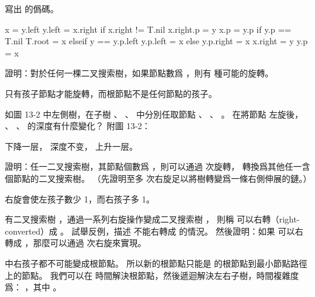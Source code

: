 \startsection[
  title={Rotations},
]

\startEXERCISE
寫出  的僞碼。
\stopEXERCISE

\startANSWER
{}
\startCLRS
x = y.left
y.left = x.right
if x.right != T.nil
	x.right.p = y
x.p = y.p
if y.p == T.nil
	T.root = x
elseif y == y.p.left
	y.p.left = x
else y.p.right = x
x.right = y
y.p = x
\stopCLRS
\stopANSWER

\startEXERCISE
證明：對於任何一棵二叉搜索樹，如果節點數爲 ，則有  種可能的旋轉。
\stopEXERCISE

\startANSWER
只有孩子節點才能旋轉，而根節點不是任何節點的孩子。
\stopANSWER

\startEXERCISE
如圖 13-2 中左側樹，在子樹 \m{\alpha}、 \m{\beta}、 \m{\gamma} 中分別任取節點 、 、 。
在將節點  左旋後， 、 、  的深度有什麼變化？ 附圖 13-2：

\externalfigure[output/e13_2_3-1]
\stopEXERCISE

\startANSWER
\m{\alpha} 下降一层， \m{\beta} 深度不变， \m{\gamma} 上升一层。
\stopANSWER

\startEXERCISE
證明：任一二叉搜索樹，其節點個數爲 ，則可以通過  次旋轉，
轉換爲其他任一含  個節點的二叉搜索樹。
（\hint 先證明至多  次右旋足以將樹轉變爲一條右側伸展的鏈。）
\stopEXERCISE

\startANSWER
右旋會使左孩子數少 1，而右孩子多 1。
\stopANSWER

\startEXERCISE
有二叉搜索樹 ，通過一系列右旋操作變成二叉搜索樹 ，
則稱  可以{\EMP 右轉（right-converted）}成 。
試舉反例，描述  不能右轉成  的情況。
然後證明：如果  可以右轉成 ，那麼可以通過  次右旋來實現。
\stopEXERCISE

\startANSWER
\externalfigure[output/e13_2_5-1]
\externalfigure[output/e13_2_5-2]

 中右孩子都不可能變成根節點。
所以新的根節點只能是  的根節點到最小節點路徑上的節點。
我們可以在  時間解決根節點，然後遞迴解決左右子樹，時間複雜度爲：
，其中 。
\stopANSWER

\stopsection

